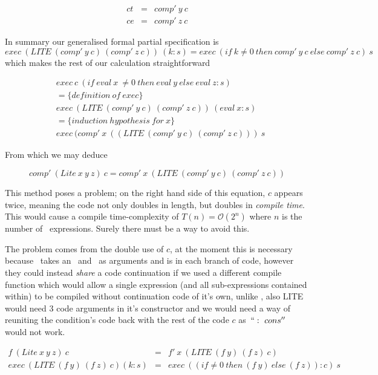 \documentclass {article}
\begin{document}
\begin{eqnarray*}
	ct &=& comp'\ y\ c \\
	ce &=& comp'\ z\ c
\end{eqnarray*}

In summary our generalised formal partial specification is
\begin{equation*}
	exec\ (LITE\ (comp'\ y\ c)\ (comp'\ z\ c) )\ (k:s) 
= exec\ (if\ k \not= 0\ then\ comp'\ y\ c\ else\ comp'\ z\ c)\ s 
\end{equation*}
which makes the rest of our calculation straightforward

\begin{align*}
	&exec\ c\ (if\ eval\ x\ \not= 0\ then\ eval\ y\ else\ eval\ z : s) \\
	&= \{definition\ of\ exec\} \\
	&exec\ (LITE\ (comp'\ y\ c)\ (comp'\ z\ c) )\ (eval\ x : s) \\
	&= \{induction\ hypothesis\ for\ x\} \\
	&exec\ (comp'\ x\ ((LITE\ (comp'\ y\ c)\ (comp'\ z\ c)))\ s
\end{align*}

From which we may deduce 

	\[ comp'\ (Lite\ x\ y\ z)\ c 
		= comp'\ x\ (LITE\ (comp'\ y\ c)\ (comp'\ z\ c)) \]

This method poses a problem;
on the right hand side of this equation,
$c$ appears twice, meaning the code not only 
doubles in length, but doubles in \emph{compile time}.
This would cause a compile time-complexity of
\( T(n) = \mathcal{O}(2^n) \)
where $n$ is the number of \lite\ expressions.
Surely there must be a way to avoid this.

The problem comes from the double use of $c$,
at the moment this is necessary because \compp\
takes an \expr\ and \code\ as arguments and is in
each branch of code,
however they could instead \emph{share}
a code continuation if we used a different compile function
which would allow a single expression 
(and all sub-expressions contained within)  
to be compiled without continuation code of it's own,
unlike \compp, also LITE would need 3 code arguments in
it's constructor and we would need a way of 
reuniting the condition's code back with the rest of the code $c$
as~$``:\ cons''$ would not work.

\begin{eqnarray*}
f\ (Lite\ x\ y\ z)\ c &=& f'\ x\ (LITE\ (f\ y)\ (f\ z)\ c) \\
exec\ (LITE\ (f\ y)\ (f\ z)\ c) (k : s) 
&=& exec\ ((if \not=0\ then\ (f\ y)\ else\ (f\ z)) : c)\ s 
\end{eqnarray*}
\end{document}
